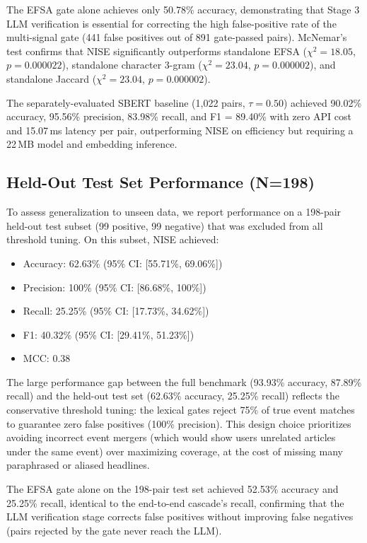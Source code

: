 \documentclass[conference]{IEEEtran}
\begin{document}
The EFSA gate alone achieves only 50.78\% accuracy, demonstrating that Stage 3 LLM verification is essential for correcting the high false-positive rate of the multi-signal gate (441 false positives out of 891 gate-passed pairs).
McNemar's test confirms that NISE significantly outperforms standalone EFSA ($\chi^2 = 18.05$, $p = 0.000022$), standalone character 3-gram ($\chi^2 = 23.04$, $p = 0.000002$), and standalone Jaccard ($\chi^2 = 23.04$, $p = 0.000002$).

The separately-evaluated SBERT baseline (1,022 pairs, $\tau = 0.50$) achieved 90.02\% accuracy, 95.56\% precision, 83.98\% recall, and F1 = 89.40\% with zero API cost and 15.07\,ms latency per pair, outperforming NISE on efficiency but requiring a 22\,MB model and embedding inference.

\subsection{Held-Out Test Set Performance (N=198)}
To assess generalization to unseen data, we report performance on a 198-pair held-out test subset (99 positive, 99 negative) that was excluded from all threshold tuning.
On this subset, NISE achieved:
\begin{itemize}
    \item Accuracy: 62.63\% (95\% CI: [55.71\%, 69.06\%])
    \item Precision: 100\% (95\% CI: [86.68\%, 100\%])
    \item Recall: 25.25\% (95\% CI: [17.73\%, 34.62\%])
    \item F1: 40.32\% (95\% CI: [29.41\%, 51.23\%])
    \item MCC: 0.38
\end{itemize}

The large performance gap between the full benchmark (93.93\% accuracy, 87.89\% recall) and the held-out test set (62.63\% accuracy, 25.25\% recall) reflects the conservative threshold tuning: the lexical gates reject 75\% of true event matches to guarantee zero false positives (100\% precision).
This design choice prioritizes avoiding incorrect event mergers (which would show users unrelated articles under the same event) over maximizing coverage, at the cost of missing many paraphrased or aliased headlines.

The EFSA gate alone on the 198-pair test set achieved 52.53\% accuracy and 25.25\% recall, identical to the end-to-end cascade's recall, confirming that the LLM verification stage corrects false positives without improving false negatives (pairs rejected by the gate never reach the LLM).
\end{document}
